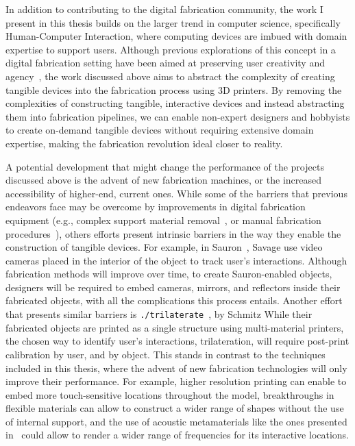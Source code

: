     In addition to contributing to the digital fabrication community, the work I
    present in this thesis builds on the larger trend in computer science,
    specifically Human-Computer Interaction, where computing devices are imbued
    with domain expertise to support users. Although previous explorations of
    this concept in a digital fabrication setting have been aimed at preserving
    user creativity and agency~\cite{Zoran:2013}, the work discussed above aims
    to abstract the complexity of creating tangible devices into the fabrication
    process using 3D printers. By removing the complexities of constructing
    tangible, interactive devices and instead abstracting them into 
    fabrication pipelines, we can enable non-expert designers and hobbyists to
    create on-demand tangible devices without requiring extensive domain
    expertise, making the fabrication revolution ideal closer to reality.

    A potential development that might change the performance of the projects
    discussed above is the advent of new fabrication machines, or the increased
    accessibility of higher-end, current ones. While some of the barriers that
    previous endeavors face may be overcome by improvements in digital
    fabrication equipment (e.g., complex support material
    removal~\cite{Laput:2015}, or manual fabrication procedures~\cite{He:2017}),
    others efforts present intrinsic barriers in the way they enable the
    construction of tangible devices. For example, in Sauron~\cite{Savage:2013},
    Savage \etal use video cameras placed in the interior of the object to track
    user's interactions.  Although fabrication methods will improve over time,
    to create Sauron-enabled objects, designers will be required to embed
    cameras, mirrors, and reflectors inside their fabricated objects, with all
    the complications this process entails. Another effort that presents similar
    barriers is \texttt{./trilaterate}~\cite{Schmitz:2019}, by Schmitz \etal
    While their fabricated objects are printed as a single structure using
    multi-material printers, the chosen way to identify user's interactions,
    trilateration, will require post-print calibration by user, and by object.
    This stands in contrast to the techniques included in this thesis, where the
    advent of new fabrication technologies will only improve their performance.
    For example, higher resolution printing can enable \at to embed more
    touch-sensitive locations throughout the model, breakthroughs in flexible
    materials can allow \mp to construct a wider range of shapes without the use
    of internal support, and the use of acoustic metamaterials like the ones
    presented in~\cite{Haberman:2016} could allow \bh to render a wider range of
    frequencies for its interactive locations.

